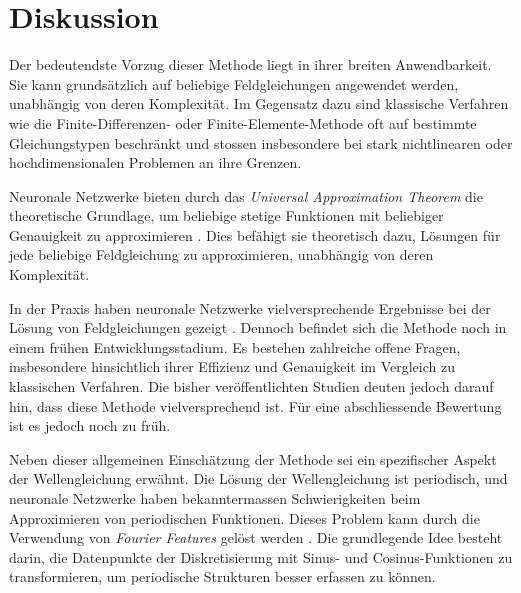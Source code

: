 %
%
%
%

\section{Diskussion}\label{neuronal:section:diskussion}

Der bedeutendste Vorzug dieser Methode liegt in ihrer breiten Anwendbarkeit.
Sie kann grundsätzlich auf beliebige Feldgleichungen angewendet werden, unabhängig von deren Komplexität.
Im Gegensatz dazu sind klassische Verfahren wie die Finite-Differenzen- oder Finite-Elemente-Methode oft auf bestimmte Gleichungstypen beschränkt und stossen insbesondere bei stark nichtlinearen oder hochdimensionalen Problemen an ihre Grenzen.

Neuronale Netzwerke bieten durch das \emph{Universal Approximation Theorem} die theoretische Grundlage, um beliebige stetige Funktionen mit beliebiger Genauigkeit zu approximieren \cite{neuronal:universal_approximation_theorem}.
Dies befähigt sie theoretisch dazu, Lösungen für jede beliebige Feldgleichung zu approximieren, unabhängig von deren Komplexität.

In der Praxis haben neuronale Netzwerke vielversprechende Ergebnisse bei der Lösung von Feldgleichungen gezeigt \cite{neuronal:pinns}.
Dennoch befindet sich die Methode noch in einem frühen Entwicklungsstadium.
Es bestehen zahlreiche offene Fragen, insbesondere hinsichtlich ihrer Effizienz und Genauigkeit im Vergleich zu klassischen Verfahren.
Die bisher veröffentlichten Studien deuten jedoch darauf hin, dass diese Methode vielversprechend ist.
Für eine abschliessende Bewertung ist es jedoch noch zu früh.

Neben dieser allgemeinen Einschätzung der Methode sei ein spezifischer Aspekt der Wellengleichung erwähnt.
Die Lösung der Wellengleichung ist periodisch, und neuronale Netzwerke haben bekanntermassen Schwierigkeiten beim Approximieren von periodischen Funktionen.
Dieses Problem kann durch die Verwendung von \emph{Fourier Features} gelöst werden \cite{neuronal:fourier_features}.
Die grundlegende Idee besteht darin, die Datenpunkte der Diskretisierung mit Sinus- und Cosinus-Funktionen zu transformieren, um periodische Strukturen besser erfassen zu können.
